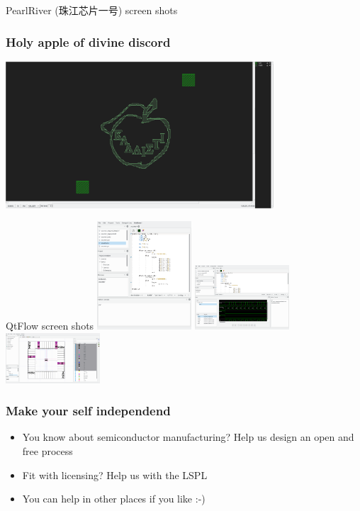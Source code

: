 \documentclass{beamer}
\begin{document}
\begin{frame}{PearlRiver (珠江芯片一号) screen shots}
	\frametitle{Holy apple of divine discord}
	\centering
	\includegraphics[width=0.75\textwidth]{Screenshot_20180929_023204.png}
\end{frame}



\begin{frame}{QtFlow screen shots}
	\includegraphics[width=100pt]{Screenshot_20171218_044022.png}
	\includegraphics[width=100pt]{Screenshot_20171218_045118.png}
	\includegraphics[width=100pt]{Screenshot_20171218_045416.png}
\end{frame}

\begin{frame}
	\frametitle{Make your self independend}
	\begin{itemize}
		\item You know about semiconductor manufacturing? Help us design an open and free process
		\item Fit with licensing? Help us with the LSPL
		\item You can help in other places if you like :-)
	\end{itemize}
\end{frame}
\end{document}
